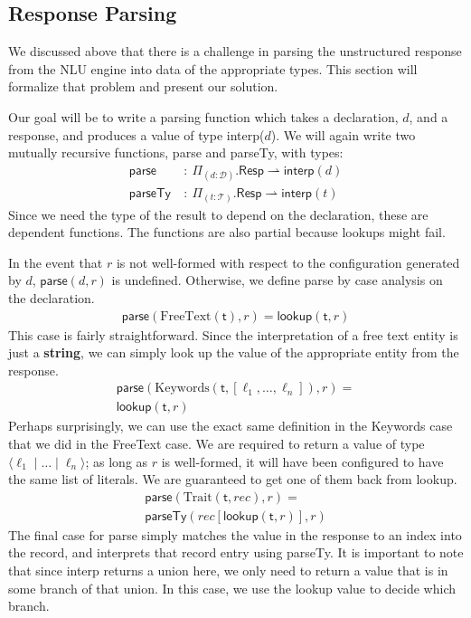 \documentclass[twocolumn]{article}
\newcommand{\fcy}[1]{\mathcal{#1}}
\newcommand{\etag}[1]{\textsf{#1}}
\newcommand{\ff}[1]{\textsf{#1}}
\begin{document}
\subsection{Response Parsing}
We discussed above that there is a challenge in parsing the unstructured
response from the NLU engine into data of the appropriate types. This section
will formalize that problem and present our solution.

Our goal will be to write a parsing function which takes a declaration, $d$, and
a response, and produces a value of type \ff{interp}($d$). We will again write
two mutually recursive functions, \ff{parse} and \ff{parseTy}, with types:
\begin{align*}
\ff{parse}\ &:\ \Pi_{(d : \fcy{D})}. \textsf{Resp} \rightharpoonup \ff{interp}(d) \\
\ff{parseTy}\ &:\ \Pi_{(t : \fcy{T})}. \textsf{Resp} \rightharpoonup \ff{interp}(t)
\end{align*}
Since we need the type of the result to depend on the declaration, these are
dependent functions. The functions are also partial because lookups might fail.

In the event that $r$ is not well-formed with respect to the configuration
generated by $d$, $\ff{parse}(d, r)$ is undefined. Otherwise, we define
\ff{parse} by case analysis on the declaration.
\begin{align*}
  \ff{parse}(\text{FreeText}(\etag{t}), r) = \ff{lookup}(\etag{t}, r)
\end{align*}
This case is fairly straightforward. Since the interpretation of a free text
entity is just a {\bf string}, we can simply look up the value of the
appropriate entity from the response.
\begin{align*}
  \ff{parse}(\text{Keywords}(\etag{t}, [\ell_1, \dots, \ell_n]), r) =\\
  \ff{lookup}(\etag{t}, r)
\end{align*}
Perhaps surprisingly, we can use the exact same definition in the Keywords case
that we did in the FreeText case. We are required to return a value of type
$\langle {\ell_1 \mid \dots \mid \ell_n} \rangle$; as long as $r$ is
well-formed, it will have been configured to have the same list of literals. We
are guaranteed to get one of them back from \ff{lookup}.
\begin{align*}
  \ff{parse}(\text{Trait}(\etag{t}, rec), r) = \\
  \ff{parseTy}(rec[\ff{lookup}(\etag{t}, r)], r)
\end{align*}
The final case for \ff{parse} simply matches the value in the response to an
index into the record, and interprets that record entry using \ff{parseTy}. It
is important to note that since \ff{interp} returns a union here, we only need
to return a value that is in some branch of that union. In this case, we use the
\ff{lookup} value to decide which branch.
\end{document}
